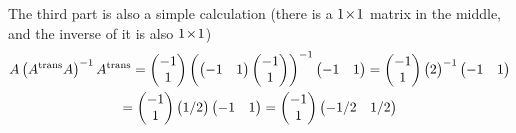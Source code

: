 \begin{exercises}
\begin{answer}
\begin{exparts}
           The third part is also a simple calculation
           (there is a $1 \! \times \! 1$ matrix in the middle,
           and the inverse of it is also $1 \! \times \! 1$)
           \begin{multline*}
             A\left(\trans{A}A\right)^{-1}\trans{A}
             =
             \begin{pmatrix}
               -1 \\ 1
             \end{pmatrix}
             \left(
               \begin{pmatrix}
                 -1  &1
               \end{pmatrix}
               \begin{pmatrix}
                 -1  \\
                  1
               \end{pmatrix}
             \right)^{-1}
             \begin{pmatrix}
               -1  &1
             \end{pmatrix}
             =
             \begin{pmatrix}
               -1 \\ 1
             \end{pmatrix}
               \begin{pmatrix}
                 2
               \end{pmatrix}^{-1}
             \begin{pmatrix}
               -1  &1
             \end{pmatrix}               \\
             =
             \begin{pmatrix}
               -1 \\ 1
             \end{pmatrix}
               \begin{pmatrix}
                 1/2
               \end{pmatrix}
             \begin{pmatrix}
               -1  &1
             \end{pmatrix}               
             =
             \begin{pmatrix}
               -1 \\ 1
             \end{pmatrix}
             \begin{pmatrix}
               -1/2  &1/2
             \end{pmatrix}               

\end{multline*}
\end{exparts}
\end{answer}
\end{exercises}
